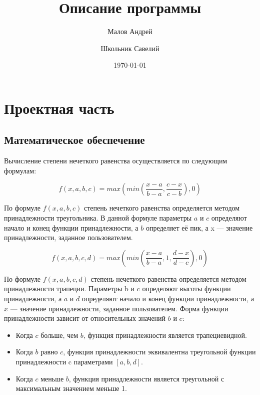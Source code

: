 \documentclass[12pt,a4paper]{report}
\author{
	Малов Андрей\\
	\and
	Школьник Савелий\\
}
\title{Описание программы}
\date{\today}
\begin{document}
\maketitle

\chapter{Проектная часть}
\section{Математическое обеспечение}

Вычисление степени нечеткого равенства осуществляется по следующим формулам:

\[f(x, a, b, c) = max(min(\frac{x - a}{b - a},\frac{c - x}{c - b}),0)\]

По формуле \(f(x,a,b,c)\) степень нечеткого равенства определяется методом принадлежности треугольника.  В данной формуле параметры \(a\) и \(c\) определяют начало и конец функции принадлежности, а \(b\) определяет её пик, а x --- значение принадлежности, заданное пользователем.

\[f(x, a, b, c, d) = max(min(\frac{x - a}{b - a},1,\frac{d - x}{d - c}),0)\]

По формуле \(f(x,a,b,c,d)\) степень нечеткого равенства определяется методом принадлежности трапеции. Параметры b и c определяют высоты функции принадлежности, а \(a\) и \(d\) определяют начало и конец функции принадлежности, а \(x\) --- значение принадлежности, заданное пользователем.
Форма функции принадлежности зависит от относительных значений \(b\) и \(c\):

\begin{itemize}
    \item Когда \(c\) больше, чем \(b\), функция принадлежности является трапециевидной.
    \item Когда \(b\) равно \(c\), функция принадлежности эквивалентна треугольной функции принадлежности c параметрами \([a, b, d]\).
    \item Когда \(c\) меньше \(b\), функция принадлежности является треугольной с максимальным значением меньше 1.
\end{itemize}
\end{document}
